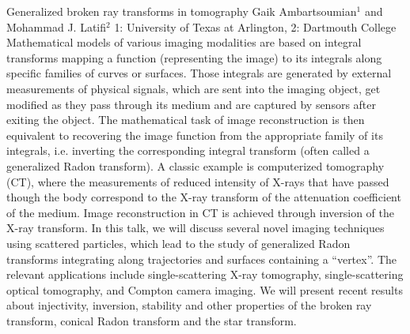 \vspace{1.5ex}
\abs
{Generalized broken ray transforms in tomography}
{Gaik Ambartsoumian$^{1}$ and Mohammad J. Latifi$^{2}$}
{1: University of Texas at Arlington, 2: Dartmouth College}
{Mathematical models of various imaging modalities are based on integral transforms mapping a function (representing the image) to its integrals along specific families of curves or surfaces. Those integrals are generated by external measurements of physical signals, which are sent into the imaging object, get modified as they pass through its medium and are captured by sensors after exiting the object. The mathematical task of image reconstruction is then equivalent to recovering the image function from the appropriate family of its integrals, i.e. inverting the corresponding integral transform (often called a generalized Radon transform).  A classic example is computerized tomography (CT), where the measurements of reduced intensity of X-rays that have passed though the body correspond to the X-ray transform of the attenuation coefficient of the medium. Image reconstruction in CT is achieved through inversion of the X-ray transform. In this talk, we will discuss several novel imaging techniques using scattered particles, which lead to the study of generalized Radon transforms integrating along trajectories and surfaces containing a ``vertex''.  The relevant applications include single-scattering X-ray tomography, single-scattering optical tomography, and Compton camera imaging. We will present recent results about injectivity, inversion, stability and other properties of the broken ray transform, conical Radon transform and the star transform.}


